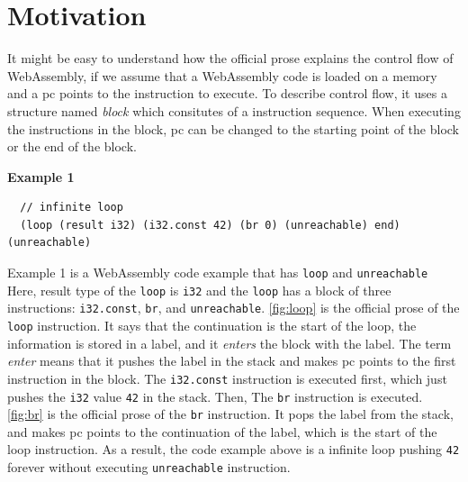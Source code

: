 
\chapter{Motivation}
\label{ch:motivation}
\noindent

\newcommand{\officialp}{official prose}
\newcommand{\spectecp}{SpecTec prose}




It might be easy to understand how the \officialp{} explains the control flow
of WebAssembly, if we assume that a WebAssembly code is loaded on a memory and
a pc points to the instruction to execute.
To describe control flow, it uses a structure named \textit{block} which
consitutes of a instruction sequence.
When executing the instructions in the block, pc can be changed to the starting
point of the block or the end of the block.


\textbf{Example 1}
\begin{verbatim}
  // infinite loop
  (loop (result i32) (i32.const 42) (br 0) (unreachable) end) (unreachable)
\end{verbatim}

Example 1 is a WebAssembly code example that has \texttt{loop} and
\texttt{unreachable}
Here, result type of the \texttt{loop} is \texttt{i32} and the \texttt{loop}
has a block of three instructions: \texttt{i32.const}, \texttt{br}, and
\texttt{unreachable}.
\cref{fig:loop} is the \officialp{} of the \texttt{loop} instruction.
It says that the continuation is the start of the loop, the information is
stored in a label, and it \textit{enters} the block with the label.
The term \textit{enter} means that it pushes the label in the stack and makes
pc points to the first instruction in the block.
The \texttt{i32.const} instruction is executed first, which just pushes the
\texttt{i32} value \texttt{42} in the stack.
Then, The \texttt{br} instruction is executed.
\cref{fig:br} is the \officialp{} of the \texttt{br} instruction.
It pops the label from the stack, and makes pc points to the continuation of
the label, which is the start of the loop instruction.
As a result, the code example above is a infinite loop pushing \texttt{42}
forever without executing \texttt{unreachable} instruction.

